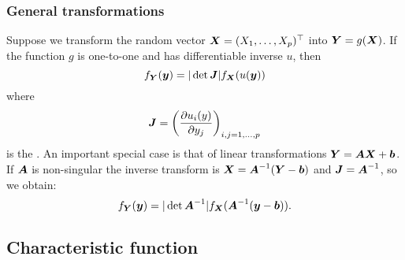 \subsubsection{General transformations}

Suppose we transform the random vector $\boldsymbol{X}=(X_1,\dots,X_p)^\top$ into $\boldsymbol{Y}=g(\boldsymbol{X})$. If the function $g$ is one-to-one and has differentiable inverse $u$, then 
\begin{equation*}
    f_{\boldsymbol{Y}}(\boldsymbol{y}) = |\det{\boldsymbol{J}}| f_{\boldsymbol{X}} (u(\boldsymbol{y}))
\end{equation*}
where 
$$
    \boldsymbol{J} = \left( \frac{\partial u_i (y)}{\partial y_j} \right)_{i,j=1,\dots,p}
$$
is the . An important special case is that of linear transformations $\boldsymbol{Y} = \boldsymbol{A}\boldsymbol{X} + \boldsymbol{b}$. If $\boldsymbol{A}$ is non-singular the inverse transform is $\boldsymbol{X} = \boldsymbol{A}^{-1}(\boldsymbol{Y}-\boldsymbol{b})$ and $\boldsymbol{J} = \boldsymbol{A}^{-1}$, so we obtain:
\begin{equation*}
    f_{\boldsymbol{Y}}(\boldsymbol{y}) = |\det{\boldsymbol{A}^{-1}}| f_{\boldsymbol{X}} (\boldsymbol{A}^{-1}(\boldsymbol{y}-\boldsymbol{b})).
\end{equation*}

\subsection{Characteristic function}

